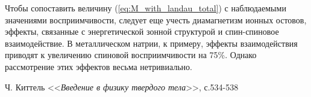 \documentclass[a4paper, 12pt, openany]{book}
\begin{document}
    Чтобы сопоставить величину (\ref{eq:M_with_landau_total}) с наблюдаемыми значениями восприимчивости, следует еще учесть
    диамагнетизм ионных остовов,
    эффекты, связанные с энергетической зонной структурой
    и спин-спиновое взаимодействие.
    В металлическом натрии, к примеру, эффекты взаимодействия приводят к увеличению спиновой восприимчивости на 75\%.
    Однако рассмотрение этих эффектов весьма нетривиально. 

	
    \begin{thebibliography}{9}
        Ч. Киттель <<\textit{Введение в физику твердого тела}>>, с.534-538
    \end{thebibliography}
	
\end{document}
